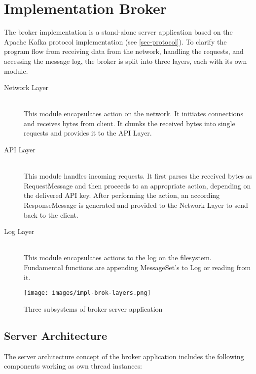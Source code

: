 \chapter{Implementation Broker}
\label{chap:broker}

The broker implementation is a stand-alone server application based on the
Apache Kafka protocol implementation (see \ref{sec-protocol}). To clarify the
program flow from receiving data from the network, handling the requests, and
accessing the message log, the broker is split into three layers, each with its
own module.

\begin{description}
    \item [Network Layer] \hfill \\
        This module encapsulates action on the network. It initiates
        connections and receives bytes from client. It chunks the received bytes
        into single requests and provides it to the API Layer. 
    \item [API Layer] \hfill \\
        This module handles incoming requests. It first parses the
        received bytes as RequestMessage and then proceeds to an appropriate action,
        depending on the delivered API key. After performing the action, an
        according ResponseMessage is generated and provided to the Network Layer
        to send back to the client. 
    \item [Log Layer] \hfill \\
        This module encapsulates actions to the log on the filesystem.
        Fundamental functions are appending MessageSet's to Log or reading from
        it. 
\end{description}

\begin{figure}[H]
    \centering
    \texttt{[image: images/impl-brok-layers.png]}
    \caption{Three subsystems of broker server application}
    \label{fig:impl-brok-layers}
\end{figure}

\section{Server Architecture}
\label{sec:impl-broker-threading}
The server architecture concept of the broker application includes the
following components working as own thread instances: 

